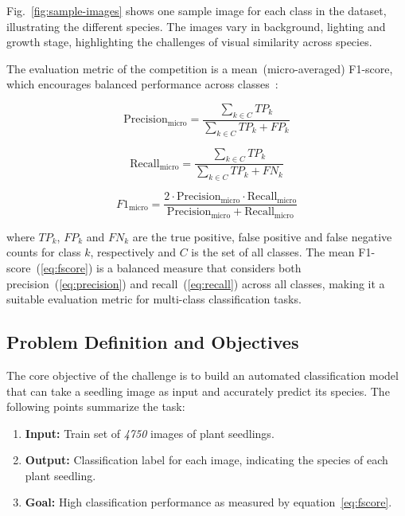 Fig.~\ref{fig:sample-images} shows one sample image for each class in the dataset, illustrating the different species. The images vary in background, lighting and growth stage, highlighting the challenges of visual similarity across species.

The evaluation metric of the competition is a mean~(micro-averaged) F1-score, which encourages balanced performance across classes~\cite{plant-seedlings-classification-evaluation}:

\begin{equation}
    \text{Precision}_{\text{micro}} = \frac{\sum_{k \in C} \mathit{TP_k}}{\sum_{k \in C} \mathit{TP_k} + \mathit{FP_k}}\label{eq:precision}
\end{equation}

\begin{equation}
    \text{Recall}_{\text{micro}} = \frac{\sum_{k \in C} \mathit{TP_k}}{\sum_{k \in C} \mathit{TP_k} + \mathit{FN_k}}\label{eq:recall}
\end{equation}

\begin{equation}
    F1_{\text{micro}} = \frac{2 \cdot \text{Precision}_{\text{micro}} \cdot \text{Recall}_{\text{micro}}}{\text{Precision}_{\text{micro}} + \text{Recall}_{\text{micro}}}\label{eq:fscore}
\end{equation}

where $TP_k$, $FP_k$ and $FN_k$ are the true positive, false positive and false negative counts for class $k$, respectively and $C$ is the set of all classes. The mean F1-score~(\ref{eq:fscore}) is a balanced measure that considers both precision~(\ref{eq:precision}) and recall~(\ref{eq:recall}) across all classes, making it a suitable evaluation metric for multi-class classification tasks.

\subsection{Problem Definition and Objectives}
The core objective of the challenge is to build an automated classification model that can take a seedling image as input and accurately predict its species. The following points summarize the task:

\begin{enumerate}
    \item \textbf{Input:} Train set of \textit{4750} images of plant seedlings.
    \item \textbf{Output:} Classification label for each image, indicating the species of each plant seedling.
    \item \textbf{Goal:} High classification performance as measured by equation~\ref{eq:fscore}.
\end{enumerate}

